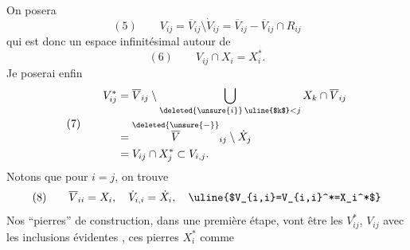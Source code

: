 On posera 
\[
(5)\qquad V_{ij}=\overline V_{ij}\setminus\dot V_{ij}=\overline V_{ij}-\overline V_{ij}\cap R_{ij}
\]
qui est donc un espace infinitésimal autour de
\[
(6)\qquad V_{ij}\cap X_i=X_i^*.
\]
Je poserai enfin
\[
(7)\qquad\begin{aligned}
V_{ij}^*&=\overline V_{ij}\setminus\bigcup_{\deleted{\unsure{i}}\,\uline{$k$}<j}X_k\cap\overline V_{ij}\\
&=\overset{\deleted{\unsure{-}}}{\overline V}_{ij}\setminus\dot X_j\\
&=V_{ij}\cap X_j^*\subset V_{i,j}.
\end{aligned}
\]
Notons que pour $i=j$, on trouve
\[
(8)\qquad\overline V_{ii}=X_i,\quad\dot V_{i,i}=\dot X_i,\quad\uline{$V_{i,i}=V_{i,i}^*=X_i^*$}
\]
Nos ``pierres'' de construction, dans une première étape, vont être les $V_{ij}^*$, $V_{ij}$ avec les inclusions évidentes
,
ces pierres   $X_i^*$ comme
